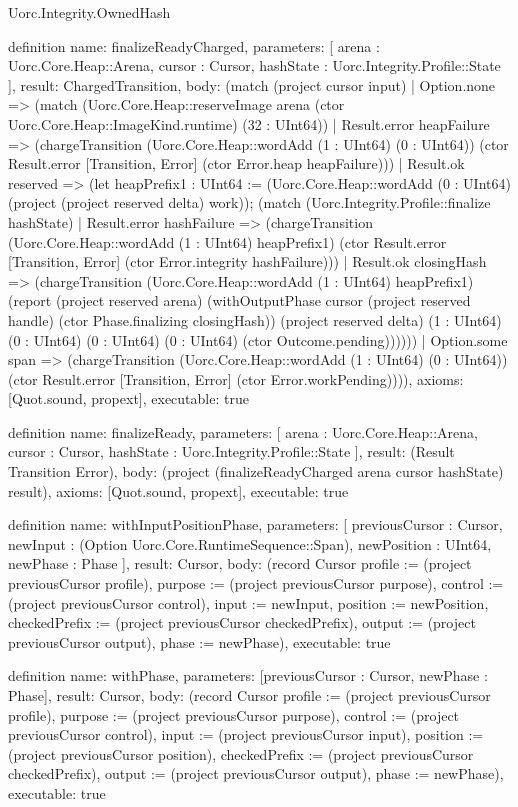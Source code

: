 \begin{lexlean}{Uorc.Integrity.OwnedHash}
\begin{semanticmodule}
definition{
  name: finalizeReadyCharged,
  parameters: [
    arena : Uorc.Core.Heap::Arena,
    cursor : Cursor,
    hashState : Uorc.Integrity.Profile::State
  ],
  result: ChargedTransition,
  body: (match (project cursor input)
    | Option.none => (match (Uorc.Core.Heap::reserveImage arena (ctor Uorc.Core.Heap::ImageKind.runtime) (32 : UInt64))
      | Result.error heapFailure => (chargeTransition (Uorc.Core.Heap::wordAdd (1 : UInt64) (0 : UInt64)) (ctor Result.error [Transition, Error] (ctor Error.heap heapFailure)))
      | Result.ok reserved => (let heapPrefix1 : UInt64 := (Uorc.Core.Heap::wordAdd (0 : UInt64) (project (project reserved delta) work)); (match (Uorc.Integrity.Profile::finalize hashState)
        | Result.error hashFailure => (chargeTransition (Uorc.Core.Heap::wordAdd (1 : UInt64) heapPrefix1) (ctor Result.error [Transition, Error] (ctor Error.integrity hashFailure)))
        | Result.ok closingHash => (chargeTransition (Uorc.Core.Heap::wordAdd (1 : UInt64) heapPrefix1) (report (project reserved arena) (withOutputPhase cursor (project reserved handle) (ctor Phase.finalizing closingHash)) (project reserved delta) (1 : UInt64) (0 : UInt64) (0 : UInt64) (0 : UInt64) (ctor Outcome.pending))))))
    | Option.some span => (chargeTransition (Uorc.Core.Heap::wordAdd (1 : UInt64) (0 : UInt64)) (ctor Result.error [Transition, Error] (ctor Error.workPending)))),
  axioms: [Quot.sound, propext],
  executable: true
}

definition{
  name: finalizeReady,
  parameters: [
    arena : Uorc.Core.Heap::Arena,
    cursor : Cursor,
    hashState : Uorc.Integrity.Profile::State
  ],
  result: (Result Transition Error),
  body: (project (finalizeReadyCharged arena cursor hashState) result),
  axioms: [Quot.sound, propext],
  executable: true
}

definition{
  name: withInputPositionPhase,
  parameters: [
    previousCursor : Cursor,
    newInput : (Option Uorc.Core.RuntimeSequence::Span),
    newPosition : UInt64,
    newPhase : Phase
  ],
  result: Cursor,
  body: (record Cursor {profile := (project previousCursor profile), purpose := (project previousCursor purpose), control := (project previousCursor control), input := newInput, position := newPosition, checkedPrefix := (project previousCursor checkedPrefix), output := (project previousCursor output), phase := newPhase}),
  executable: true
}

definition{
  name: withPhase,
  parameters: [previousCursor : Cursor, newPhase : Phase],
  result: Cursor,
  body: (record Cursor {profile := (project previousCursor profile), purpose := (project previousCursor purpose), control := (project previousCursor control), input := (project previousCursor input), position := (project previousCursor position), checkedPrefix := (project previousCursor checkedPrefix), output := (project previousCursor output), phase := newPhase}),
  executable: true
}


\end{semanticmodule}
\end{lexlean}
